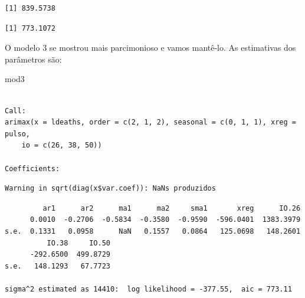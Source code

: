\documentclass[
  letterpaper,
  DIV=11,
  numbers=noendperiod]{scrartcl}
\newenvironment{Shaded}{\begin{snugshade}}{\end{snugshade}}
\newcommand{\DecValTok}[1]{\textcolor[rgb]{0.68,0.00,0.00}{#1}}
\newcommand{\FunctionTok}[1]{\textcolor[rgb]{0.28,0.35,0.67}{#1}}
\newcommand{\NormalTok}[1]{\textcolor[rgb]{0.00,0.23,0.31}{#1}}
\newcommand{\OtherTok}[1]{\textcolor[rgb]{0.00,0.23,0.31}{#1}}
\newcommand{\SpecialCharTok}[1]{\textcolor[rgb]{0.37,0.37,0.37}{#1}}
\theoremstyle{definition}
\theoremstyle{definition}
\theoremstyle{plain}
\theoremstyle{plain}
\theoremstyle{remark}
\begin{document}
\begin{verbatim}
[1] 839.5738
\end{verbatim}

\begin{Shaded}
\end{Shaded}

\begin{verbatim}
[1] 773.1072
\end{verbatim}

O modelo 3 se mostrou mais parcimonioso e vamos mantê-lo. As estimativas
dos parâmetros são:

\begin{Shaded}
\begin{Highlighting}[]
\NormalTok{mod3}
\end{Highlighting}
\end{Shaded}

\begin{verbatim}

Call:
arimax(x = ldeaths, order = c(2, 1, 2), seasonal = c(0, 1, 1), xreg = pulso, 
    io = c(26, 38, 50))

Coefficients:
\end{verbatim}

\begin{verbatim}
Warning in sqrt(diag(x$var.coef)): NaNs produzidos
\end{verbatim}

\begin{verbatim}
         ar1      ar2      ma1      ma2     sma1       xreg      IO.26
      0.0010  -0.2706  -0.5834  -0.3580  -0.9590  -596.0401  1383.3979
s.e.  0.1331   0.0958      NaN   0.1557   0.0864   125.0698   148.2601
          IO.38     IO.50
      -292.6500  499.8729
s.e.   148.1293   67.7723

sigma^2 estimated as 14410:  log likelihood = -377.55,  aic = 773.11
\end{verbatim}

\begin{Shaded}
\end{Shaded}
\end{document}
